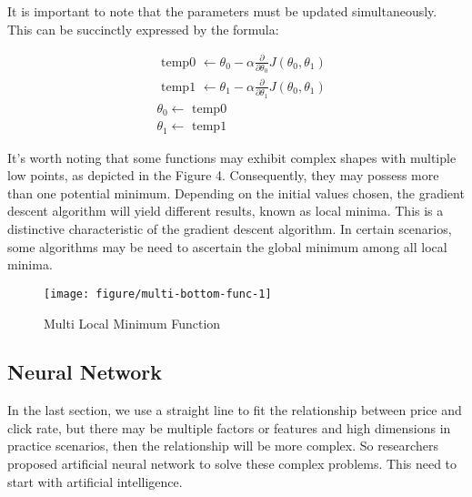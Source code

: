 \documentclass{article}
\begin{document}
    It is important to note that the parameters must be updated simultaneously. This can be succinctly expressed by the formula:

     \hspace*{\fill}
    \begin{equation}
     \begin{aligned} & \text { temp0 } \leftarrow \theta_0-\alpha \frac{\partial}{\partial \theta_0} J\left(\theta_0, \theta_1\right) \\ & \text { temp1 }\leftarrow \theta_1-\alpha \frac{\partial}{\partial \theta_1} J\left(\theta_0, \theta_1\right) \\ & \theta_0 \leftarrow \text { temp0 } \\ & \theta_1 \leftarrow \text { temp1 }\end{aligned}
    \end{equation}
     \hspace*{\fill}


It's worth noting that some functions may exhibit complex shapes with multiple low points, as depicted in the Figure 4. Consequently, they may possess more than one potential minimum. Depending on the initial values chosen, the gradient descent algorithm will yield different results, known as local minima. This is a distinctive characteristic of the gradient descent algorithm. In certain scenarios, some algorithms may be need to ascertain the global minimum among all local minima.


    \begin{figure}[htbp]
        \centering
        \texttt{[image: figure/multi-bottom-func-1]}
        \caption{Multi Local Minimum Function}
     \end{figure}


     \newpage
	\subsection{Neural Network}

    In the last section, we use a straight line to fit the relationship between price and click rate, but there may be multiple factors or features and high dimensions in practice scenarios, then the relationship will be more complex. So researchers proposed artificial neural network to solve these complex problems. This need to start with artificial intelligence.
\end{document}
